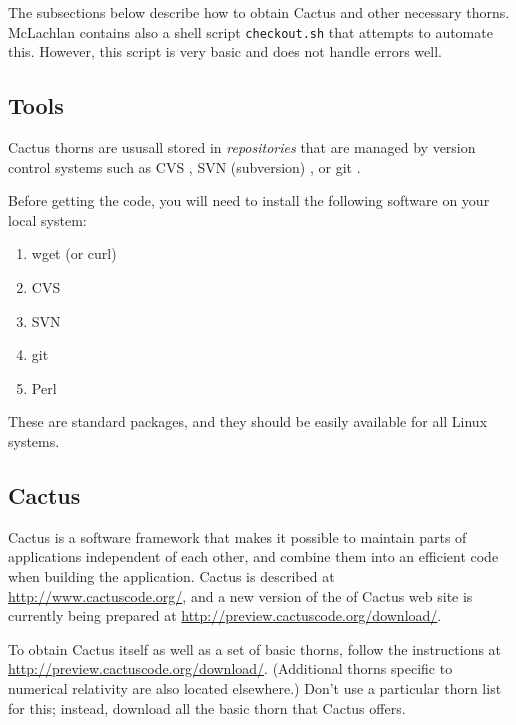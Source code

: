 \documentclass[11pt, tightenlines]{revtex4}
\newcommand{\code}[1]{\texttt{#1}}
\begin{document}
The subsections below describe how to obtain Cactus and other
necessary thorns.  McLachlan contains also a shell script
\code{checkout.sh} that attempts to automate this.  However, this
script is very basic and does not handle errors well.

\subsection{Tools}

Cactus thorns are ususall stored in \emph{repositories} that are
managed by version control systems such as CVS \cite{cvsweb}, SVN
(subversion) \cite{svnweb}, or git \cite{gitweb}.

Before getting the code, you will need to install the following
software on your local system:
\begin{enumerate}
\item wget (or curl)
\item CVS
\item SVN
\item git
\item Perl
\end{enumerate}
These are standard packages, and they should be easily available for
all Linux systems.

\subsection{Cactus}
\label{sec:cactus}

Cactus \cite{Goodale02a, ES-cactusweb} is a software framework that
makes it possible to maintain parts of applications independent of
each other, and combine them into an efficient code when building the
application.  Cactus is described at \url{http://www.cactuscode.org/},
and a new version of the of Cactus web site is currently being
prepared at \url{http://preview.cactuscode.org/download/}.

To obtain Cactus itself as well as a set of basic thorns, follow the
instructions at \url{http://preview.cactuscode.org/download/}.
(Additional thorns specific to numerical relativity are also located
elsewhere.)  Don't use a particular thorn list for this; instead,
download all the basic thorn that Cactus offers.
\end{document}
